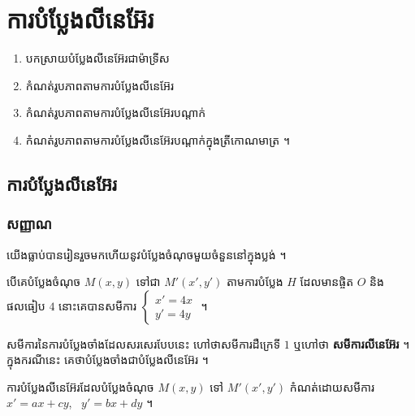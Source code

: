 \chapter{ការបំប្លែងលីនេអ៊ែរ}

\begin{objBox}[វត្ថុបំណង]
\begin{enumerate}[1]
  \item បកស្រាយបំប្លែងលីនេអ៊ែរជាម៉ាទ្រីស
  \item កំណត់រូបភាពតាមការបំប្លែងលីនេអ៊ែរ
  \item កំណត់រូបភាពតាមការបំប្លែងលីនេអ៊ែរបណ្ដាក់
  \item កំណត់រូបភាពតាមការបំប្លែងលីនេអ៊ែរបណ្ដាក់ក្នុងត្រីកោណមាត្រ ។
\end{enumerate}
\end{objBox}

\section{ការបំប្លែងលីនេអ៊ែរ}
\subsection{សញ្ញាណ}

យើងធ្លាប់បានរៀនរួចមកហើយនូវបំប្លែងចំណុចមួយចំនួននៅក្នុងប្លង់ ។

\begin{example}[ឧទាហរណ៍]
បើគេបំប្លែងចំណុច $M(x, y)$ ទៅជា $M'(x', y')$ តាមការបំប្លែង $H$ ដែលមានផ្ចិត $O$ និងផលធៀប $4$ នោះគេបានសមីការ $\begin{cases} x' = 4x\\ y' = 4y \end{cases}$ ។
\end{example}

សមីការនៃការបំប្លែងចាំងដែលសរសេរបែបនេះ ហៅថាសមីការដឺក្រេទី $1$ ឬហៅថា \textbf{សមីការលីនេអ៊ែរ} ។ ក្នុងករណីនេះ គេថាបំប្លែងចាំងជាបំប្លែងលីនេអ៊ែរ ។

\begin{formulaBox}[ជាទូទៅ]
ការបំប្លែងលីនេអ៊ែរដែលបំប្លែងចំណុច $M(x, y)$ ទៅ $M'(x', y')$ កំណត់ដោយសមីការ $x' = ax + cy$, \ $y' = bx + dy$ ។
\end{formulaBox}

